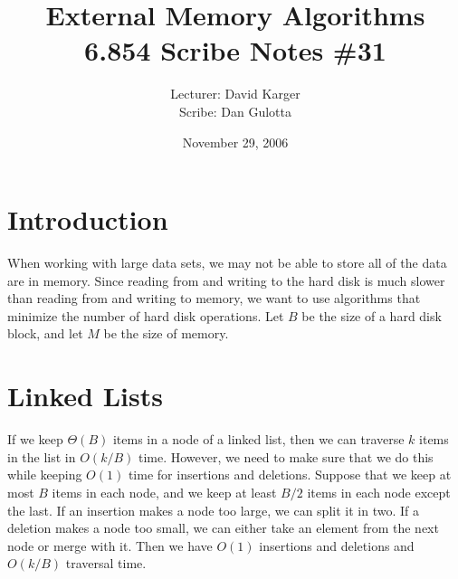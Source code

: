 \documentclass{article}
\title{External Memory Algorithms\\6.854 Scribe Notes \#31}
\date{November 29, 2006}
\author{Lecturer: David Karger\\ Scribe: Dan Gulotta}
\begin{document}
%
%
%
%

%



\section{Introduction}
When working with large data sets, we may not be
able to store all of the data are in memory.  Since
reading from and writing to the hard disk is much slower than
reading from and writing to memory, we want to
use algorithms that minimize the number of hard disk operations.  Let $B$ be the size of a hard disk block, and let $M$ be the size of memory.

\section{Linked Lists}
If we keep $\Theta(B)$ items in a node of a linked
list, then we can traverse $k$ items in the list in $O(k/B)$
time.  However, we need to make sure that we do this
while keeping $O(1)$ time for insertions and deletions.
Suppose that we keep at most $B$ items in each node, and we keep at least $B/2$ items in each node except the last.
If an insertion makes a node too large, we can split it in two.  If a deletion makes a node too small, we can either take an element from the next node or merge with it.
Then we have $O(1)$ insertions and deletions and $O(k/B)$
traversal time.
\end{document}
